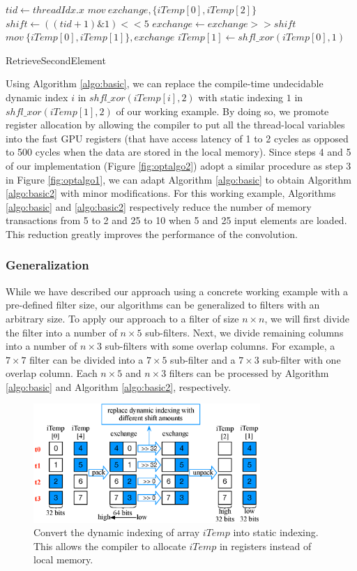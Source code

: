 \begin{algorithm}[t!]
	$tid \gets threadIdx.x$\;
	$mov\ exchange, \{iTemp[0], iTemp[2]\}$\;
	$shift \gets ((tid+1)\&1)<<5$\;
	$exchange \gets exchange >> shift$\;
	$mov\ \{iTemp[0],iTemp[1]\}, exchange$\;
	$iTemp[1] \gets shfl\_xor(iTemp[0],1)$\;	
	\caption{RetrieveSecondElement}
	\label{algo:basic2}
\end{algorithm}

Using Algorithm \ref{algo:basic}, we can replace the compile-time undecidable dynamic index $i$ in $shfl\_xor(iTemp[i],2)$ with static
indexing $1$ in $shfl\_xor(iTemp[1],2)$ of our working example. By doing so, we promote register allocation by allowing the compiler to put
all the thread-local variables into the fast GPU registers (that have access latency of 1 to 2 cycles as opposed to 500 cycles when the
data are stored in the local memory). Since steps 4 and 5 of our implementation (Figure \ref{fig:optalgo2}) adopt a similar procedure as
step 3 in Figure \ref{fig:optalgo1}, we can adapt Algorithm \ref{algo:basic} to obtain Algorithm \ref{algo:basic2} with minor
modifications.  For this working example, Algorithms \ref{algo:basic} and \ref{algo:basic2} respectively
reduce the number of memory transactions from 5 to 2 and 25 to 10 when 5 and 25 input elements are loaded. This reduction greatly improves
the performance of the convolution.

\subsubsection{Generalization} While we have described our approach using a concrete working example with a pre-defined filter size, our
algorithms can be generalized to filters with an arbitrary size. To apply our approach to a filter of size $n \times n$, we will first
divide the filter into a number of $n \times 5$ sub-filters. Next, we divide remaining columns into a number of $n \times 3$ sub-filters
with some overlap columns. For example, a $7 \times 7$ filter can be divided into a $7 \times 5$ sub-filter and a $7 \times 3$ sub-filter
with one overlap column. Each $n \times 5$ and $n \times 3$ filters can be processed by Algorithm \ref{algo:basic} and Algorithm
\ref{algo:basic2}, respectively.






\begin{figure}[t!]
	\centering
	\includegraphics[width=\columnwidth,height=4.5cm]{./figure/exchange.eps}
\caption{Convert the dynamic indexing of array $iTemp$ into static indexing. This allows the compiler to allocate $iTemp$ in registers instead of local memory.}
\label{fig:exchange}
\end{figure}


